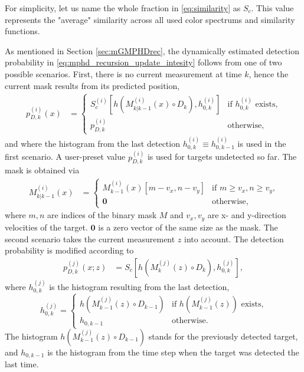 For simplicity, let us name the whole fraction in \eqref{eq:similarity} as $S_c$. This value represents the "average" similarity across all used color spectrums and similarity functions.

As mentioned in Section \ref{sec:mGMPHDrec}, the dynamically estimated detection probability in \eqref{eq:mphd_recursion_update_intesity} follows from one of two possible scenarios. First, there is no current measurement at
time $k$, hence the current mask results from its predicted position,
\begin{align}
  \label{eq:mphd_recursion_update_intesity_misdetect_pd}
  p_{D,k}^{(i)}(x) &=
  \begin{cases}
     S_c^{(i)}\left[h(M_{k|k-1}^{(i)}(x) \circ D_k), h_{0,k}^{(i)}\right] &\text{if $h_{0,k}^{(i)}$ exists,} \\
     p_{D,k}^{(i)} \quad& \text{otherwise,}
  \end{cases}
\end{align}
and where the histogram from the last detection $h_{0,k}^{(i)} \equiv  h_{0,k-1}^{(i)}$ is used in the first scenario. A user-preset value $p_{D,k}^{(i)}$ is used for targets undetected so far. The mask is obtained via
\begin{align}
  \label{eq:mphd_recursion_update_intesity_misdetect_M_shifted}
  M_{k|k-1}^{(i)}(x) &=
  \begin{cases}
    \!M_{k-1}^{(i)}(x)[m-v_x, n-v_y] &\text{if $m\geq v_x, n\geq v_y$,} \\
    \mathbf{0} \quad &\text{otherwise,}
  \end{cases}
\end{align}
where $m, n$ are indices of the binary mask $M$ and $v_x, v_y$ are x- and y-direction velocities of the target. $\mathbf{0}$ is a zero vector of the same size as the mask. The second scenario takes the current measurement $z$ into account. The detection probability is modified according to
\begin{align}
  p_{D,k}^{(j)}(x;z) &= S_c\left[h(M_{k}^{(j)}(z) \circ D_k), h_{0,k}^{(j)}\right],
\end{align}
where $h_{0,k}^{(j)}$ is the histogram resulting from the last detection,
\begin{equation}
  \label{eq:mphd_recursion_update_intesity_misdetect_Hist}
  h_{0,k}^{(j)} =
  \begin{cases}
    h(M_{k-1}^{(j)}(z) \circ D_{k-1}) &\text{if } h(M_{k-1}^{(j)}(z)) \text{ exists,} \\
    h_{0,k-1} &\text{otherwise.}
  \end{cases}
\end{equation}
The histogram $h(M_{k-1}^{(j)}(z) \circ D_{k-1})$ stands for the previously detected target, and $h_{0,k-1}$ is the histogram from the time step when the target was detected the last time.



